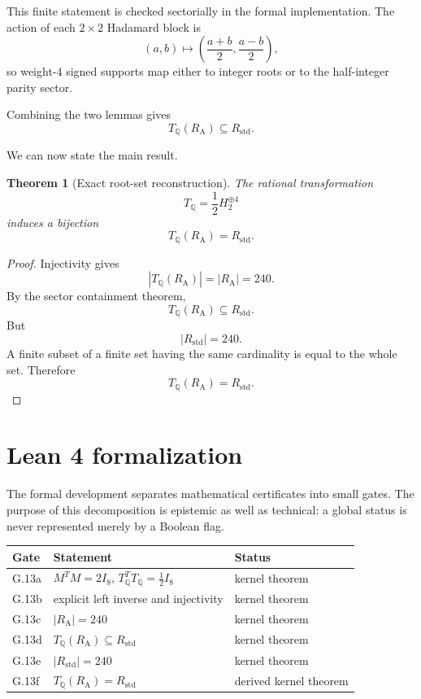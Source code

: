 \documentclass[11pt,a4paper]{article}
\newtheorem{theorem}{Theorem}[section]
\theoremstyle{definition}
\theoremstyle{remark}
\newcommand{\RA}{R_{\mathrm A}}
\newcommand{\Rstd}{R_{\mathrm{std}}}
\newcommand{\TQ}{T_{\mathbb Q}}
\begin{document}
This finite statement is checked sectorially in the formal implementation.
The action of each $2\times2$ Hadamard block is
\[
(a,b)
\longmapsto
\left(
\frac{a+b}{2},
\frac{a-b}{2}
\right),
\]
so weight-$4$ signed supports map either to integer roots or to the
half-integer parity sector.

Combining the two lemmas gives
\[
\boxed{
\TQ(\RA)\subseteq\Rstd.
}
\]

We can now state the main result.

\begin{theorem}[Exact root-set reconstruction]
\label{thm:root-reconstruction}
The rational transformation
\[
\TQ=\frac12H_2^{\oplus4}
\]
induces a bijection
\[
\boxed{
\TQ(\RA)=\Rstd.
}
\]
\end{theorem}

\begin{proof}
Injectivity gives
\[
|\TQ(\RA)|=|\RA|=240.
\]
By the sector containment theorem,
\[
\TQ(\RA)\subseteq\Rstd.
\]
But
\[
|\Rstd|=240.
\]
A finite subset of a finite set having the same cardinality is equal to the
whole set.  Therefore
\[
\TQ(\RA)=\Rstd.
\]
\end{proof}

\section{Lean 4 formalization}

The formal development separates mathematical certificates into small gates.
The purpose of this decomposition is epistemic as well as technical:
a global status is never represented merely by a Boolean flag.

\begin{center}
\begin{tabular}{lll}
\toprule
Gate & Statement & Status\\
\midrule
G.13a &
$M^TM=2I_8$, $\TQ^T\TQ=\frac12I_8$
&
kernel theorem
\\
G.13b &
explicit left inverse and injectivity
&
kernel theorem
\\
G.13c &
$|\RA|=240$
&
kernel theorem
\\
G.13d &
$\TQ(\RA)\subseteq\Rstd$
&
kernel theorem
\\
G.13e &
$|\Rstd|=240$
&
kernel theorem
\\
G.13f &
$\TQ(\RA)=\Rstd$
&
derived kernel theorem
\\
\bottomrule
\end{tabular}
\end{center}
\end{document}
